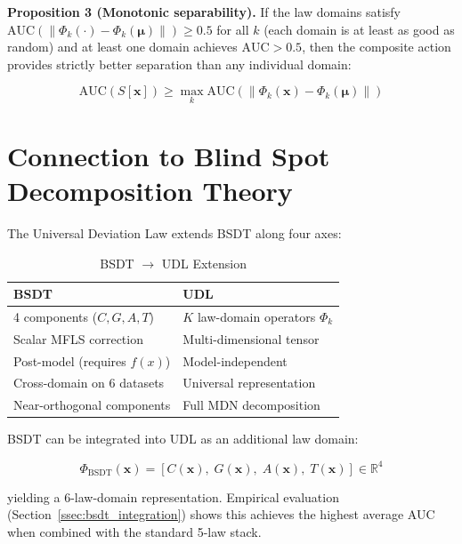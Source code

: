 \documentclass[journal]{IEEEtran}
\newcommand{\R}{\mathbb{R}}
\newcommand{\norm}[1]{\left\lVert#1\right\rVert}
\begin{document}
\textbf{Proposition 3 (Monotonic separability).} If the law domains satisfy $\text{AUC}(\norm{\Phi_k(\cdot) - \Phi_k(\boldsymbol{\mu})}) \geq 0.5$ for all $k$ (each domain is at least as good as random) and at least one domain achieves $\text{AUC} > 0.5$, then the composite action provides strictly better separation than any individual domain:

\begin{equation}
\text{AUC}\!\left(S[\mathbf{x}]\right) \geq \max_k \text{AUC}\!\left(\norm{\Phi_k(\mathbf{x}) - \Phi_k(\boldsymbol{\mu})}\right)
\label{eq:monotonic}
\end{equation}

\section{Connection to Blind Spot Decomposition Theory}
\label{sec:bsdt}

The Universal Deviation Law extends BSDT along four axes:

\begin{table}[h]
\centering
\caption{BSDT $\to$ UDL Extension}
\label{tab:bsdt_udl}
\begin{tabular}{@{}ll@{}}
\toprule
\textbf{BSDT} & \textbf{UDL} \\
\midrule
4 components ($C, G, A, T$) & $K$ law-domain operators $\Phi_k$ \\
Scalar MFLS correction & Multi-dimensional tensor \\
Post-model (requires $f(x)$) & Model-independent \\
Cross-domain on 6 datasets & Universal representation \\
Near-orthogonal components & Full MDN decomposition \\
\bottomrule
\end{tabular}
\end{table}

BSDT can be integrated into UDL as an additional law domain:

\begin{equation}
\Phi_{\text{BSDT}}(\mathbf{x}) = [C(\mathbf{x}),\; G(\mathbf{x}),\; A(\mathbf{x}),\; T(\mathbf{x})] \in \R^4
\label{eq:bsdt_spectrum}
\end{equation}

yielding a 6-law-domain representation. Empirical evaluation (Section~\ref{ssec:bsdt_integration}) shows this achieves the highest average AUC when combined with the standard 5-law stack.
\end{document}
